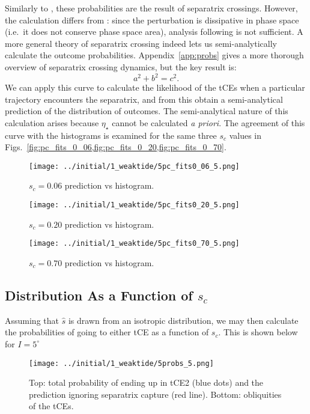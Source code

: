\documentclass[twocolumn]{aastex63}
\begin{document}
Similarly to \citet{su2020}, these probabilities are the result of separatrix
crossings. However, the calculation differs from \citet{su2020}: since the
perturbation is dissipative in phase space (i.e.\ it does not conserve phase
space area), analysis following \citet{henrard1982} is not sufficient. A more
general theory of separatrix crossing indeed lets us semi-analytically calculate
the outcome probabilities. Appendix~\ref{app:probs} gives a more thorough
overview of separatrix crossing dynamics, but the key result is:
\begin{equation}
    a^2 + b^2 = c^2.
\end{equation}
We can apply this curve to calculate the likelihood of the tCEs when a
particular trajectory encounters the separatrix, and from this obtain a
semi-analytical prediction of the distribution of outcomes. The semi-analytical
nature of this calculation arises because $\eta_\star$ cannot be calculated
\emph{a priori}. The agreement of this curve with the histograms is examined for
the same three $s_c$ values in
Figs.~\ref{fig:pc_fits_0_06,fig:pc_fits_0_20,fig:pc_fits_0_70}.
\begin{figure}
    \centering
    \texttt{[image: ../initial/1\_weaktide/5pc\_fits0\_06\_5.png]}
    \caption{$s_c = 0.06$ prediction vs histogram.}\label{fig:pc_fits_0_06}
\end{figure}
\begin{figure}
    \centering
    \texttt{[image: ../initial/1\_weaktide/5pc\_fits0\_20\_5.png]}
    \caption{$s_c = 0.20$ prediction vs histogram.}\label{fig:pc_fits_0_20}
\end{figure}
\begin{figure}
    \centering
    \texttt{[image: ../initial/1\_weaktide/5pc\_fits0\_70\_5.png]}
    \caption{$s_c = 0.70$ prediction vs histogram.}\label{fig:pc_fits_0_70}
\end{figure}

\subsection{Distribution As a Function of $s_c$}\label{ss:s_c_dist}

Assuming that $\hat{s}$ is drawn from an isotropic distribution, we may then
calculate the probabilities of going to either tCE as a function of $s_c$. This
is shown below for $I = 5^\circ$
\begin{figure}
    \centering
    \texttt{[image: ../initial/1\_weaktide/5probs\_5.png]}
    \caption{Top: total probability of ending up in tCE2 (blue dots) and the
    prediction ignoring separatrix capture (red line). Bottom:
    obliquities of the tCEs.}\label{fig:probs}
\end{figure}
\end{document}
